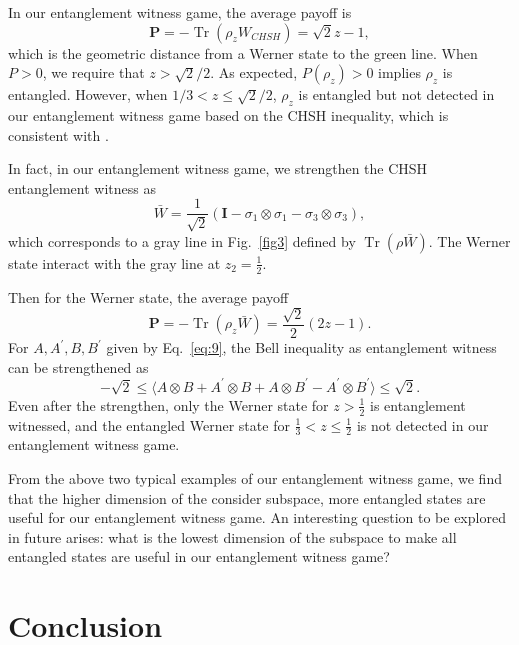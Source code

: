 \documentclass[twocolumn,pra,showpacs,superscriptaddress]{revtex4-1}
\DeclareMathOperator{\Tr}{Tr}
\begin{document}
In our entanglement witness game, the average payoff is
\begin{equation}
  \label{eq:6}
  \textbf{P} = - \Tr(\rho_{z} W_{CHSH}) = \sqrt{2} z - 1,
\end{equation}
which is the geometric distance from a Werner state to the green line.
When $P>0$, we require that $z>\sqrt{2}/2$. As expected,
$P(\rho_{z})>0$ implies $\rho_{z}$ is entangled. However, when
$1/3<z\leq\sqrt{2}/2$, $\rho_{z}$ is entangled but not detected in our entanglement witness game based on the CHSH inequality, which is consistent with \cite{hor2}\cite{wis}.


In fact, in our entanglement witness game, we strengthen the CHSH entanglement witness as
\begin{equation}
  \label{eq:7}
  \bar{W} = \frac{1}{\sqrt{2}} (\textbf{I} -
  \sigma_1\otimes\sigma_1 - \sigma_3\otimes\sigma_3),
\end{equation}
which corresponds to a gray line in Fig.~\ref{fig3} defined by
$\Tr(\rho \bar{W})$. The Werner state interact with the gray line at
$z_{2}=\frac{1}{2}$.

Then for the Werner state, the average payoff
\begin{equation}
  \label{eq:8}
  \textbf{P} = - \Tr(\rho_{z} \bar{W}) = \frac{\sqrt{2}}{2} (2z - 1).
\end{equation}
For  $A,A^{\prime},B,B^{\prime}$ given by Eq.~\eqref{eq:9}, the Bell inequality as
entanglement witness can be strengthened as
\begin{equation}
  -\sqrt{2}\leq\langle A\otimes B + A^{\prime} \otimes
  B + A\otimes B^{\prime} - A^{\prime} \otimes B^{\prime}\rangle\le
  \sqrt{2}.
\end{equation}
Even after the strengthen, only the Werner state for $z>\frac{1}{2}$
is entanglement witnessed, and the entangled Werner state for
$\frac{1}{3}<z\le \frac{1}{2}$ is not detected in our entanglement witness game.

From the above two typical examples of our entanglement witness game, we find that
the higher dimension of the consider subspace, more entangled states
are useful for our entanglement witness game. An interesting question to be
explored in future arises: what is the lowest dimension of the
subspace to make all entangled states are useful in our entanglement witness game?


\section{Conclusion}
\end{document}
